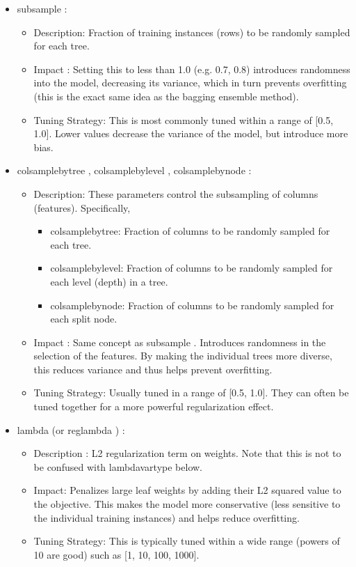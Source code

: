 \begin{itemize}[noitemsep]
\item subsample : 

\begin{itemize}[noitemsep] 
\item Description: Fraction of training instances (rows) to be randomly sampled for each tree.
\item Impact : Setting this to less than 1.0 (e.g. 0.7, 0.8) introduces randomness into the model, decreasing its variance, which in turn prevents overfitting (this is the exact same idea as the bagging ensemble method).
\item Tuning Strategy: This is most commonly tuned within a range of [0.5, 1.0]. Lower values decrease the variance of the model, but introduce more bias.
\end{itemize} 

\item colsample\textunderscore bytree , colsample\textunderscore bylevel , colsample\textunderscore bynode : 

\begin{itemize}[noitemsep] 
\item Description: These parameters control the subsampling of columns (features). Specifically, 
\begin{itemize} 
\item colsample\textunderscore bytree: Fraction of columns to be randomly sampled for each tree.
\item colsample\textunderscore bylevel: Fraction of columns to be randomly sampled for each level (depth) in a tree.
\item colsample\textunderscore bynode: Fraction of columns to be randomly sampled for each split node.
\end{itemize} 
\item Impact : Same concept as subsample . Introduces randomness in the selection of the features. By making the individual trees more diverse, this reduces variance and thus helps prevent overfitting.
\item Tuning Strategy: Usually tuned in a range of [0.5, 1.0]. They can often be tuned together for a more powerful regularization effect.
\end{itemize} 

\item lambda (or reg\textunderscore lambda ) : 

\begin{itemize}[noitemsep] 
\item Description : L2 regularization term on weights. Note that this is not to be confused with lambda\textunderscore vartype below.
\item Impact: Penalizes large leaf weights by adding their L2 squared value to the objective. This makes the model more conservative (less sensitive to the individual training instances) and helps reduce overfitting.
\item Tuning Strategy: This is typically tuned within a wide range (powers of 10 are good) such as [1, 10, 100, 1000].
\end{itemize} 


\end{itemize}
